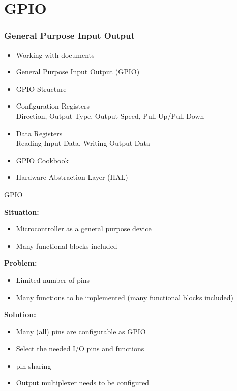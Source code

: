 \section{GPIO}
\subsubsection{General Purpose Input Output}

\begin{remark}
    \begin{itemize}
        \item Working with documents
        \item General Purpose Input Output (GPIO)
        \item GPIO Structure
        \item Configuration Registers\\
        Direction, Output Type, Output Speed, Pull-Up/Pull-Down
        \item Data Registers\\
        Reading Input Data, Writing Output Data
        \item GPIO Cookbook
        \item Hardware Abstraction Layer (HAL)
    \end{itemize}
\end{remark}

\begin{definition}{GPIO}

    \textbf{Situation:}
    \begin{itemize}
        \item Microcontroller as a general purpose device
        \item Many functional blocks included
    \end{itemize}

    \textbf{Problem:}
    \begin{itemize}
        \item Limited number of pins
        \item Many functions to be implemented (many functional blocks included)
    \end{itemize}

    \textbf{Solution:}
    \begin{itemize}
        \item Many (all) pins are configurable as GPIO
        \item Select the needed I/O pins and functions
        \item \oq pin sharing\cq
        \item Output multiplexer needs to be configured
    \end{itemize}
\end{definition}

